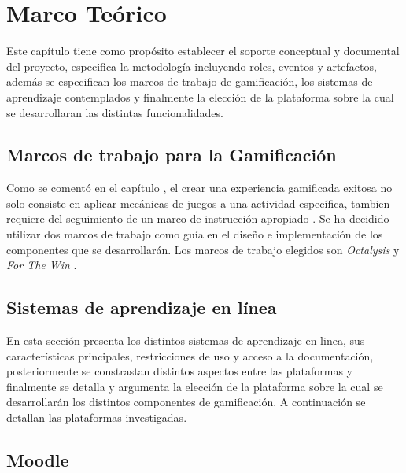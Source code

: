\chapter{Marco Teórico}
\label{ch:marcoTeorico}

 Este capítulo tiene como propósito establecer el soporte conceptual y documental del proyecto,
 especifica la metodología incluyendo roles, eventos y artefactos, además se especifican los
 marcos de trabajo de gamificación, los sistemas de aprendizaje contemplados y finalmente
 la elección de la plataforma sobre la cual se desarrollaran las distintas funcionalidades.

    

\section{Marcos de trabajo para la Gamificación}

 Como se comentó en el capítulo , el crear una experiencia
 gamificada exitosa no solo consiste en aplicar mecánicas de juegos a una actividad
 específica, tambien requiere del seguimiento de un marco de instrucción apropiado \cite[p. 1110]{GamInE-Learning}.
 Se ha decidido utilizar dos marcos de trabajo como guía en el diseño e implementación
 de los componentes que se desarrollarán. Los marcos de trabajo elegidos son {\it Octalysis}
 \cite{Octalysis} y {\it For The Win} \cite{ForTheWin}.

    
    

\clearpage
\section{Sistemas de aprendizaje en línea}
\label{sec:sistemasaprendizaje}

 En esta sección presenta los distintos sistemas de aprendizaje en linea, sus características
 principales, restricciones de uso y acceso a la documentación, posteriormente se constrastan
 distintos aspectos entre las plataformas y finalmente se detalla y argumenta la elección de 
 la plataforma sobre la cual se desarrollarán los distintos componentes de gamificación.
 A continuación se detallan las plataformas investigadas.

    

\clearpage
\section{Moodle}

